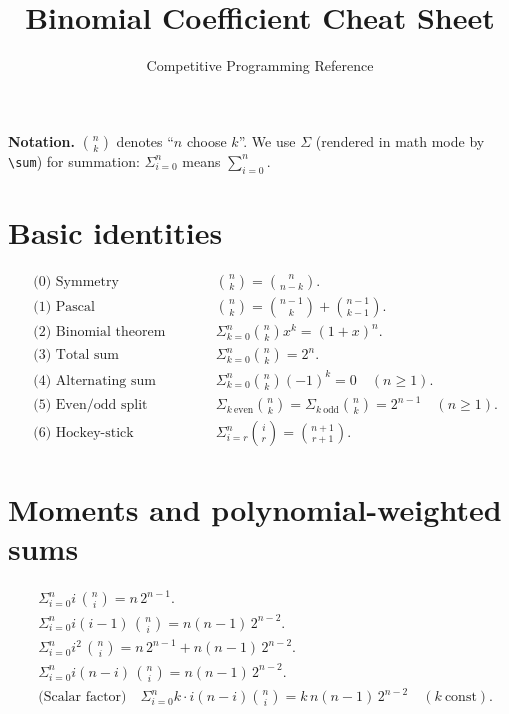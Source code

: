\documentclass[11pt,a4paper]{article}
\title{Binomial Coefficient Cheat Sheet}
\author{Competitive Programming Reference}
\date{}
\begin{document}
\maketitle

\noindent\textbf{Notation.} \(\displaystyle \binom{n}{k}\) denotes ``\(n\) choose \(k\)''. 
We use \(\Sigma\) (rendered in math mode by \verb|\sum|) for summation: 
\(\Sigma_{i=0}^{n}\) means \(\sum_{i=0}^{n}\).

\bigskip

\section*{Basic identities}
\begin{align*}
&\text{(0) Symmetry}\qquad &&\binom{n}{k}=\binom{n}{n-k}.\\
&\text{(1) Pascal}\qquad &&\binom{n}{k}=\binom{n-1}{k}+\binom{n-1}{k-1}.\\
&\text{(2) Binomial theorem}\qquad &&\Sigma_{k=0}^{n}\binom{n}{k}x^{k}=(1+x)^{n}.\\
&\text{(3) Total sum}\qquad &&\Sigma_{k=0}^{n}\binom{n}{k}=2^{n}.\\
&\text{(4) Alternating sum}\qquad &&\Sigma_{k=0}^{n}\binom{n}{k}(-1)^{k}=0\quad(n\ge1).\\
&\text{(5) Even/odd split}\qquad &&\Sigma_{k\ \text{even}}\binom{n}{k}=\Sigma_{k\ \text{odd}}\binom{n}{k}=2^{n-1}\quad(n\ge1).\\
&\text{(6) Hockey-stick}\qquad &&\Sigma_{i=r}^{n}\binom{i}{r}=\binom{n+1}{r+1}.
\end{align*}

\section*{Moments and polynomial-weighted sums}
\begin{align*}
&\Sigma_{i=0}^{n} i\,\binom{n}{i} = n\,2^{n-1}.\\[6pt]
&\Sigma_{i=0}^{n} i(i-1)\,\binom{n}{i} = n(n-1)\,2^{n-2}.\\[6pt]
&\Sigma_{i=0}^{n} i^{2}\,\binom{n}{i} = n\,2^{n-1} + n(n-1)\,2^{n-2}.\\[6pt]
&\Sigma_{i=0}^{n} i(n-i)\,\binom{n}{i} = n(n-1)\,2^{n-2}.\\[6pt]
&\text{(Scalar factor)}\quad 
\Sigma_{i=0}^{n} k\cdot i(n-i)\binom{n}{i} = k\,n(n-1)\,2^{n-2}\quad (k\ \text{const}).
\end{align*}
\end{document}
